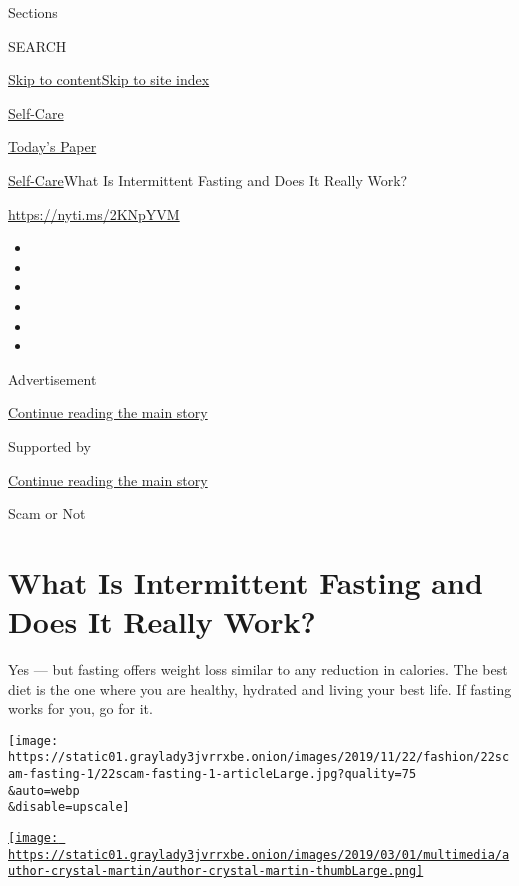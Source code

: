 Sections

SEARCH

\protect\hyperlink{site-content}{Skip to
content}\protect\hyperlink{site-index}{Skip to site index}

\href{https://www.nytimes3xbfgragh.onion/section/style/self-care/}{Self-Care}

\href{https://myaccount.nytimes3xbfgragh.onion/auth/login?response_type=cookie\&client_id=vi}{}

\href{https://www.nytimes3xbfgragh.onion/section/todayspaper}{Today's
Paper}

\href{/section/style/self-care/}{Self-Care}\textbar{}What Is
Intermittent Fasting and Does It Really Work?

\href{https://nyti.ms/2KNpYVM}{https://nyti.ms/2KNpYVM}

\begin{itemize}
\item
\item
\item
\item
\item
\item
\end{itemize}

Advertisement

\protect\hyperlink{after-top}{Continue reading the main story}

Supported by

\protect\hyperlink{after-sponsor}{Continue reading the main story}

Scam or Not

\hypertarget{what-is-intermittent-fasting-and-does-it-really-work}{%
\section{What Is Intermittent Fasting and Does It Really
Work?}\label{what-is-intermittent-fasting-and-does-it-really-work}}

Yes --- but fasting offers weight loss similar to any reduction in
calories. The best diet is the one where you are healthy, hydrated and
living your best life. If fasting works for you, go for it.

\texttt{[image: https://static01.graylady3jvrrxbe.onion/images/2019/11/22/fashion/22scam-fasting-1/22scam-fasting-1-articleLarge.jpg?quality=75\\\&auto=webp\\\&disable=upscale]}

\href{https://www.nytimes3xbfgragh.onion/by/crystal-martin}{\texttt{[image: https://static01.graylady3jvrrxbe.onion/images/2019/03/01/multimedia/author-crystal-martin/author-crystal-martin-thumbLarge.png]}}

